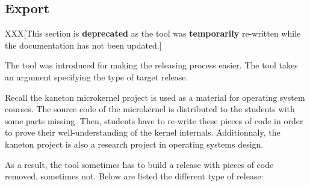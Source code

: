 %
%
%
%
%
%

%
%

\subsection{Export}
\label{section:export}

XXX[This section is \textbf{deprecated} as the tool was \textbf{temporarily}
re-written while the documentation has not been updated.]

The  tool was introduced for making the releasing process
easier. The tool takes an argument specifying the type of target release.

Recall the kaneton microkernel project is used as a material for operating
system courses. The source code of the microkernel is distributed to
the students with some parts missing. Then, students have to re-write
these pieces of code in order to prove their well-understanding of the
kernel internals. Additionnaly, the kaneton project is also a research project
in operating systems design.

As a result, the  tool sometimes has to build a release
with pieces of code removed, sometimes not. Below are listed the different
type of release:

